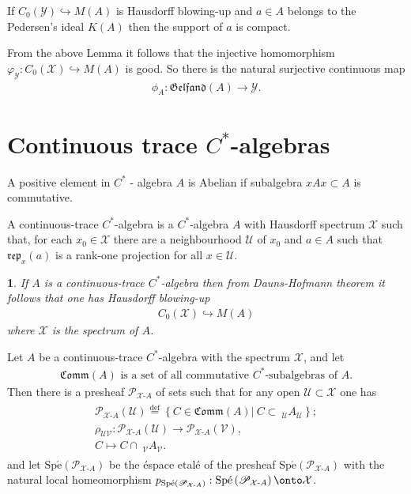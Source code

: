 \documentclass{beamer}
\theoremstyle{plain}
\newtheorem{empt}[prop]{}%
\newcommand{\bean}{\begin{eqnarray*}}
\newcommand{\eean}{\end{eqnarray*}}
\newcommand{\rep}{\mathfrak{rep}}
\newcommand{\sU}{\mathcal{U}}       %
\newcommand{\sV}{\mathcal{V}}       %
\newcommand{\sX}{\mathcal{X}}       %
\newcommand{\sY}{\mathcal{Y}}       %
\newcommand{\bydef}{\stackrel{\mathrm{def}}{=}}
\newcommand{\hookto}{\hookrightarrow}        %
\begin{document}
\begin{frame}
	\begin{lemma}\label{blowing_pedersen_compact_lem}
	If  $C_0\left( \sY\right)\hookto M\left( A\right)$ is Hausdorff blowing-up and $a\in A$ belongs to the Pedersen's ideal $K\left(A \right)$  then the support of $a$  is compact.
\end{lemma}
	From the above Lemma it follows that the injective homomorphism $\varphi_\sY : C_0\left(\sX \right) \hookto M\left(A \right)$ is good. So there is the natural surjective continuous map
\bean
\phi_A : \mathfrak{Gelfand}\left(A \right) \to \sY.
\eean
\end{frame}


\section{Continuous trace $C^*$-algebras}
\begin{frame}
\begin{definition}\label{abelian_element_defn}
	A positive element in $C^*$ - algebra $A$ is \alert{ Abelian} if subalgebra $xAx \subset A$ is commutative.
\end{definition}
\begin{definition}\label{continuous_trace_c_alt_defn}
	A \alert{continuous-trace} $C^*$-\alert{algebra} is a $C^*$-algebra $A$ with Hausdorff
	spectrum $\sX$ such that, for each $x_0\in\sX$ there are a neighbourhood $\sU$ of $x_0$ and $a\in A$ such that $\rep_{ x}\left( a\right) $ is a rank-one projection for all $x \in \sU$.
	\end{definition}
	\begin{empt}
If $A$ is a continuous-trace $C^*$-algebra then from Dauns-Hofmann theorem it follows that one has Hausdorff blowing-up
\bean
C_0\left( \sX\right)\hookto M\left( A\right)
\eean 
where $\sX$ is the spectrum of $A$.
	\end{empt}
	\end{frame}
	\begin{frame}

		Let   $A$  be a {continuous-trace} $C^*$-{algebra} with the spectrum $\sX$, and let
\bean
\mathfrak{Comm}\left( A\right)  \text{ is a set of all commutative } C^*\text{-subalgebras of } A.
\eean
Then there is a presheaf  $\mathscr P_{\sX\text{-}A}$  of sets such that for any open $\sU \subset \sX$  one has
\bean
\begin{split}
	\mathscr P_{\sX\text{-}A}\left(\sU \right)\bydef \left\{ C \in	\mathfrak{Comm}\left( A\right) \left|~ C \subset ~_\sU A_\sU \right. \right\};\\
	\rho_{\sU\sV} : \mathscr P_{\sX\text{-}A}\left(\sU \right)\to \mathscr P_{\sX\text{-}A}\left(\sV \right),\\
	C \mapsto C \cap ~_\sV A _\sV.
\end{split}
\eean
and let $\mathrm{Sp\acute{e}}\left(\mathscr P_{\sX\text{-}A} \right)$ be the \'espace etal\'e of the presheaf $\mathrm{Sp\acute{e}}\left(\mathscr P_{\sX\text{-}A} \right)$  with the natural local homeomorphism $p_{\mathrm{Sp\acute{e}}\left(\mathscr P_{\sX\text{-}A} \right)} : \mathrm{Sp\acute{e}}\left(\mathscr P_{\sX\text{-}A} \right) \onto \sX$.
	\end{frame}
\end{document}
